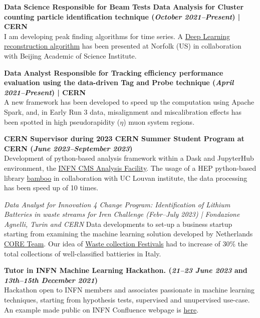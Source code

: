 \documentclass[11pt]{res}
\begin{document}
\begin{resume}
\textbf{Data Science Responsible for Beam Tests Data Analysis for Cluster counting particle identification technique (\textit{October 2021--Present}) | CERN}\\
I am developing peak finding algorithms for time series. A \href{https://indico.jlab.org/event/459/contributions/11749/}{Deep Learning reconstruction algorithm} has been presented at Norfolk (US) in collaboration with Beijing Academic of Science Institute.

\textbf{Data Analyst Responsible for Tracking efficiency performance evaluation using the data-driven Tag and Probe technique (\textit{April 2021--Present}) | CERN}\\
A new framework has been developed to speed up the computation using Apache Spark, and, in Early Run 3 data, misalignment and miscalibration effects has been spotted in high pseudorapidity ($\eta$) muon system regions.

\textbf{CERN Supervisor during 2023 CERN Summer Student Program at CERN (\textit{June 2023--September 2023})} \\
Development of python-based analysis framework within a Dask and JupyterHub environment, the \href{https://infn-cms-analysisfacility.readthedocs.io/en/latest/}{INFN CMS Analysis Facility}. The usage of a HEP python-based library \href{https://bamboo-hep.readthedocs.io/en/latest/index.html}{bamboo} in collaboration with UC Louvan institute, the data processing has been speed up of 10 times.

\textit{Data Analyst for Innovation 4 Change Program: Identification of Lithium Batteries in waste streams for Iren Challenge (\textit{Febr--July 2023}) | Fondazione Agnelli, Turin and CERN}
Data developments to set-up a business startup starting from examining the machine learning solution developed by Netherlands \href{https://www.core-changemakers.com}{CORE Team}. Our idea of \href{https://weeefestival.mystrikingly.com}{Waste collection Festivals} had to increase of 30\% the total collections of well-classified battieries in Italy.

\textbf{Tutor in INFN Machine Learning Hackathon. (\textit{21--23 June 2023} and \textit{13th--15th December 2021})}\\ 
Hackathon open to INFN members and associates passionate in machine learning techniques, starting from hypothesis tests, supervised and unupervised use-case. An example made public on INFN Confluence webpage is \href{https://confluence.infn.it/pages/viewpage.action?pageId=53906361}{here}.


\end{resume}
\end{document}
